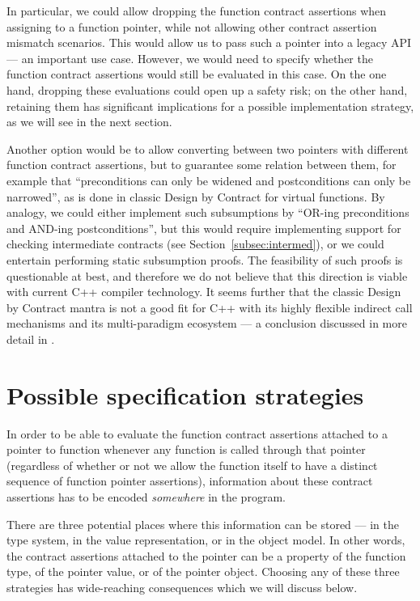 In particular, we could allow dropping the function contract assertions when assigning to a function pointer, while not allowing other contract assertion mismatch scenarios. This would allow us to pass such a pointer into a legacy API --- an important use case. However, we would need to specify whether the function contract assertions would still be evaluated in this case. On the one hand, dropping these evaluations could open up a safety risk; on the other hand, retaining them has significant implications for a possible implementation strategy, as we will see in the next section.

Another option would be to allow converting between two pointers with different function contract assertions, but to guarantee some relation between them, for example that ``preconditions can only be widened and postconditions can only be narrowed'', as is done in classic Design by Contract for virtual functions. By analogy, we could either implement such subsumptions by ``OR-ing preconditions and AND-ing postconditions'', but this would require implementing support for checking intermediate contracts (see Section~\ref{subsec:intermed}), or we could entertain performing static subsumption proofs. The feasibility of such proofs is questionable at best, and therefore we do not believe that this direction is viable with current C++ compiler technology. It seems further that the classic Design by Contract mantra is not a good fit for C++ with its highly flexible indirect call mechanisms and its multi-paradigm ecosystem --- a conclusion discussed in more detail in \cite{P3097R0}.
\section{Possible specification strategies}
\label{sec:specstrat}

In order to be able to evaluate the function contract assertions attached to a pointer to function whenever any function is called through that pointer (regardless of whether or not we allow the function itself to have a distinct sequence of function pointer assertions), information about these contract assertions has to be encoded \emph{somewhere} in the program.

There are three potential places where this information can be stored --- in the type system, in the value representation, or in the object model. In other words, the contract assertions attached to the pointer can be a property of the function type, of the pointer value, or of the pointer object. Choosing any of these three strategies has wide-reaching consequences which we will discuss below.


